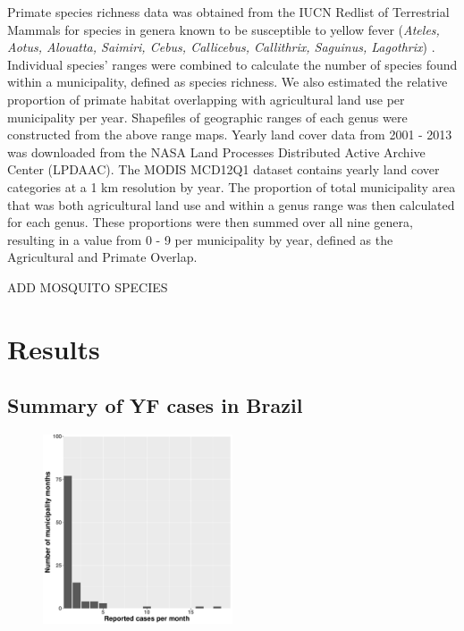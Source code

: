 \documentclass{article}
\begin{document}
Primate species richness data was obtained from the IUCN Redlist of Terrestrial Mammals for species in genera known to be susceptible to yellow fever (\textit{Ateles, Aotus, Alouatta, Saimiri, Cebus, Callicebus, Callithrix, Saguinus, Lagothrix}) \cite{bicca-marques2010,hamrick2017}. Individual species' ranges were combined to calculate the number of species found within a municipality, defined as species richness. We also estimated the relative proportion of primate habitat overlapping with agricultural land use per municipality per year. Shapefiles of geographic ranges of each genus were constructed from the above range maps. Yearly land cover data from 2001 - 2013 was downloaded from the NASA Land Processes Distributed Active Archive Center (LPDAAC). The MODIS MCD12Q1 dataset contains yearly land cover categories at a 1 km resolution by year. The proportion of total municipality area that was both agricultural land use and within a genus range was then calculated for each genus.  These proportions were then summed over all nine genera, resulting in a value from 0 - 9 per municipality by year, defined as the Agricultural and Primate Overlap.

ADD MOSQUITO SPECIES


\section*{Results}

\subsection*{Summary of YF cases in Brazil}


\begin{figure} [h]
\centering
\includegraphics[width=0.5\textwidth]{Hist_Reported_Cases}
\caption{}
\label{}
\end{figure}
\end{document}
